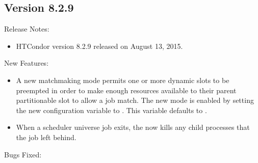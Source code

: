 \subsection*{\label{sec:New-8-2-9}Version 8.2.9}

\noindent Release Notes:

\begin{itemize}

\item HTCondor version 8.2.9 released on August 13, 2015.

\end{itemize}


\noindent New Features:

\begin{itemize}

\item A new matchmaking mode permits one or more dynamic slots to
be preempted in order to make enough resources available to their parent
partitionable slot to allow a job match.
The new mode is enabled by setting the new configuration variable
 to .
This variable defaults to .

\item When a scheduler universe job exits, the  now kills
any child processes that the job left behind.

\end{itemize}

\noindent Bugs Fixed:

